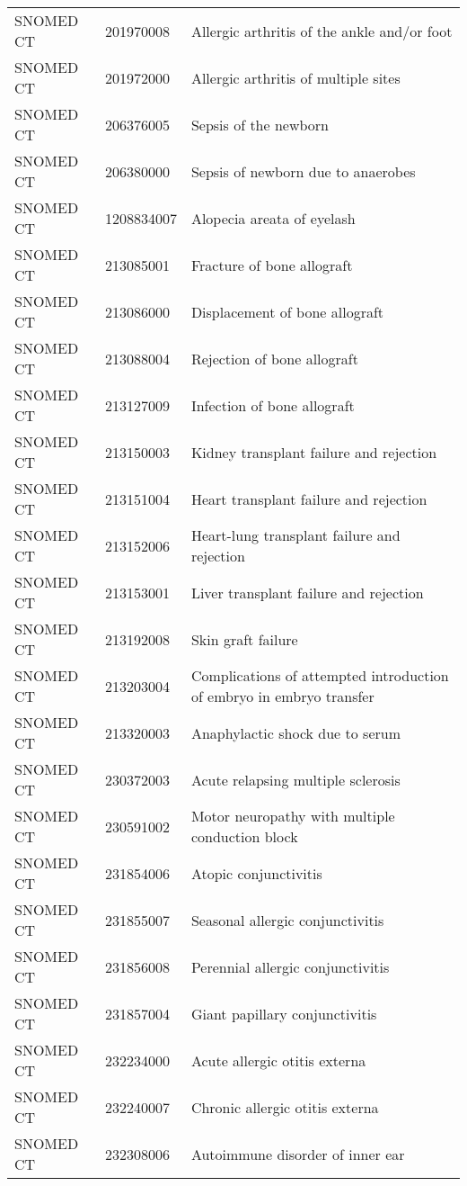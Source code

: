 \begin{longtable}{p{}p{}p{}}
  SNOMED CT & 201970008 & Allergic arthritis of the ankle and/or foot \\ 
  SNOMED CT & 201972000 & Allergic arthritis of multiple sites \\ 
  SNOMED CT & 206376005 & Sepsis of the newborn \\ 
  SNOMED CT & 206380000 & Sepsis of newborn due to anaerobes \\ 
  SNOMED CT & 1208834007 & Alopecia areata of eyelash \\ 
  SNOMED CT & 213085001 & Fracture of bone allograft \\ 
  SNOMED CT & 213086000 & Displacement of bone allograft \\ 
  SNOMED CT & 213088004 & Rejection of bone allograft \\ 
  SNOMED CT & 213127009 & Infection of bone allograft \\ 
  SNOMED CT & 213150003 & Kidney transplant failure and rejection \\ 
  SNOMED CT & 213151004 & Heart transplant failure and rejection \\ 
  SNOMED CT & 213152006 & Heart-lung transplant failure and rejection \\ 
  SNOMED CT & 213153001 & Liver transplant failure and rejection \\ 
  SNOMED CT & 213192008 & Skin graft failure \\ 
  SNOMED CT & 213203004 & Complications of attempted introduction of embryo in embryo transfer \\ 
  SNOMED CT & 213320003 & Anaphylactic shock due to serum \\ 
  SNOMED CT & 230372003 & Acute relapsing multiple sclerosis \\ 
  SNOMED CT & 230591002 & Motor neuropathy with multiple conduction block \\ 
  SNOMED CT & 231854006 & Atopic conjunctivitis \\ 
  SNOMED CT & 231855007 & Seasonal allergic conjunctivitis \\ 
  SNOMED CT & 231856008 & Perennial allergic conjunctivitis \\ 
  SNOMED CT & 231857004 & Giant papillary conjunctivitis \\ 
  SNOMED CT & 232234000 & Acute allergic otitis externa \\ 
  SNOMED CT & 232240007 & Chronic allergic otitis externa \\ 
  SNOMED CT & 232308006 & Autoimmune disorder of inner ear \\ 

\end{longtable}
